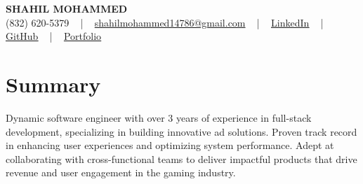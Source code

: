 \documentclass[letterpaper,10pt]{article}
\begin{document}
\begin{center}
    {\fontsize{14pt}{12pt}\selectfont \textbf{\MakeUppercase{Shahil Mohammed}}}\\ \vspace{2pt}
    \fontsize{10pt}{12pt}\selectfont (832) 620-5379 ~ | ~ \href{mailto:shahilmohammed14786@gmail.com}{shahilmohammed14786@gmail.com} ~ | ~  
    \href{https://www.linkedin.com/in/shahil-mohammed-9652931a1/}{\color{blue}\underline{LinkedIn}}  ~ | ~ 
    \href{https://github.com/freakbeast14}{\color{blue}\underline{GitHub}} ~ | ~ 
    \href{https://shahil-mohammed.netlify.app/}{\color{blue}\underline{Portfolio}}
    \vspace{-8pt}
\end{center}

\section{Summary}
\vspace{-2pt}\fontsize{8pt}{9pt}\selectfont
Dynamic software engineer with over 3 years of experience in full-stack development, specializing in building innovative ad solutions. Proven track record in enhancing user experiences and optimizing system performance. Adept at collaborating with cross-functional teams to deliver impactful products that drive revenue and user engagement in the gaming industry.
 \vspace{-5pt}
 
\vspace{-2pt}
\end{document}
